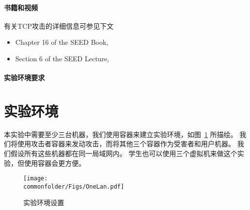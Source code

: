 \paragraph{书籍和视频}
有关TCP攻击的详细信息可参见下文

\begin{itemize}
\item Chapter 16 of the SEED Book, \seedbook
\item Section 6 of the SEED Lecture, \seedisvideo
\end{itemize}


\paragraph{实验环境要求} \seedenvironmentC



\section{实验环境}


本实验中需要至少三台机器，我们使用容器来建立实验环境，如图~\ref{tcp:fig:labsetup} 所描绘。
我们将使用攻击者容器来发动攻击，而将其他三个容器作为受害者和用户机器。
我们假设所有这些机器都在同一局域网内。
学生也可以使用三个虚拟机来做这个实验，但使用容器会更方便。


\begin{figure}[htb]
\begin{center}
\texttt{[image: \\commonfolder/Figs/OneLan.pdf]}
\end{center}
\caption{实验环境设置}
\label{tcp:fig:labsetup}
\end{figure}
 

%
 

